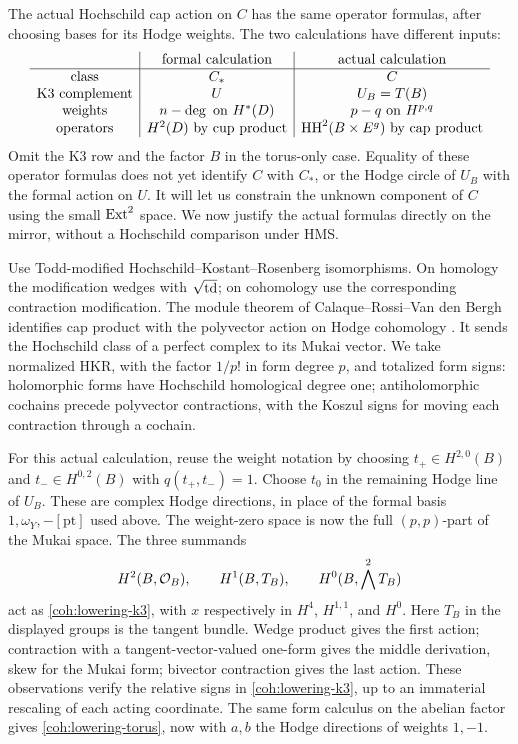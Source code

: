 The actual Hochschild cap action on \(C\) has the same operator
formulas, after choosing bases for its Hodge weights.  The two
calculations have different inputs:
\[
\begin{array}{c|c|c}
 &\text{formal calculation}&\text{actual calculation}\\ \hline
 \text{class}&C_*&C\\
 \text{K3 complement}&U&U_B=T(B)\\
 \text{weights}&n-\deg\text{ on }H^*(D)&p-q\text{ on }H^{p,q}\\
 \text{operators}&H^2(D)\text{ by cup product}
   &\operatorname{HH}^2(B\times E^g)\text{ by cap product}
\end{array}
\]
Omit the K3 row and the factor \(B\) in the torus-only case.
Equality of these operator formulas does not yet identify \(C\) with
\(C_*\), or the Hodge circle of \(U_B\) with the formal action on
\(U\).  It will let us constrain the unknown component of \(C\)
using the small \(\operatorname{Ext}^2\) space.  We now justify the actual formulas
directly on the mirror, without a Hochschild comparison under HMS.

Use Todd-modified Hochschild--Kostant--Rosenberg isomorphisms.  On
homology the modification wedges with \(\sqrt{\operatorname{td}}\); on cohomology
use the corresponding contraction modification.  The module theorem
of Calaque--Rossi--Van den Bergh identifies cap product with the
polyvector action on Hodge cohomology
\cite[Theorem~1.4]{CalaqueRossiVanDenBergh}.  It sends the Hochschild
class of a perfect complex to its Mukai vector.  We take normalized HKR,
with the factor \(1/p!\) in form degree \(p\), and totalized form
signs: holomorphic forms have Hochschild homological degree one;
antiholomorphic cochains precede polyvector contractions, with the
Koszul signs for moving each contraction through a cochain.

For this actual calculation, reuse the weight notation by choosing
\(t_+\in H^{2,0}(B)\) and
\(t_-\in H^{0,2}(B)\) with \(q(t_+,t_-)=1\).
Choose \(t_0\) in the remaining Hodge line of \(U_B\).
These are complex Hodge directions, in place of the formal basis
\(1,\omega_Y,-[\mathrm{pt}]\) used above.  The weight-zero space is
now the full \((p,p)\)-part of the Mukai space.  The three summands
\[
 H^2(B,\mathcal O_B),\qquad H^1(B,T_B),\qquad
 H^0(B,\bigwedge^2 T_B)
\]
act as \eqref{coh:lowering-k3}, with \(x\) respectively in
\(H^4\), \(H^{1,1}\), and \(H^0\).  Here \(T_B\) in the displayed
groups is the tangent bundle.  Wedge product gives the first action;
contraction with a tangent-vector-valued one-form gives the middle
derivation, skew for the Mukai form; bivector contraction gives the
last action.  These observations verify the relative signs in
\eqref{coh:lowering-k3}, up to an immaterial rescaling of each acting
coordinate.  The same form calculus on the abelian factor gives
\eqref{coh:lowering-torus}, now with \(a,b\) the Hodge directions of
weights \(1,-1\).

